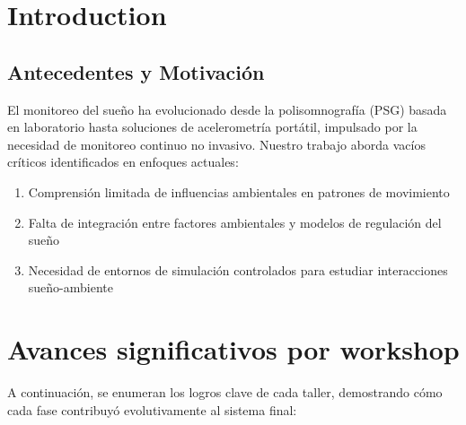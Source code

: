 \documentclass[conference]{IEEEtran}
\begin{document}
\section{Introduction}
\subsection{Antecedentes y Motivación}
El monitoreo del sueño ha evolucionado desde la polisomnografía (PSG) basada en laboratorio hasta soluciones de acelerometría portátil, impulsado por la necesidad de monitoreo continuo no invasivo. Nuestro trabajo aborda vacíos críticos identificados en enfoques actuales:
\begin{enumerate}
    \item Comprensión limitada de influencias ambientales en patrones de movimiento
    \item Falta de integración entre factores ambientales y modelos de regulación del sueño
    \item Necesidad de entornos de simulación controlados para estudiar interacciones sueño-ambiente
\end{enumerate}
\section{Avances significativos por workshop}

A continuación, se enumeran los logros clave de cada taller, demostrando cómo cada fase contribuyó evolutivamente al sistema final:
\end{document}

